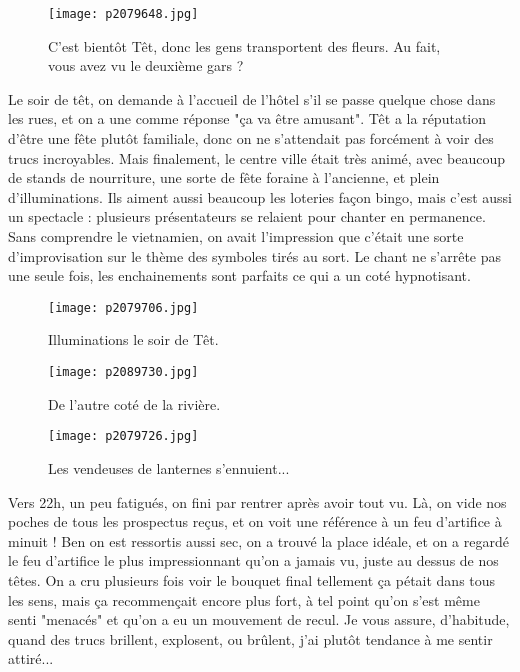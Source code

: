\documentclass{book}
\begin{document}
\begin{figure}[h]
\centering
\texttt{[image: p2079648.jpg]}
\caption*{C'est bientôt Têt, donc les gens transportent des fleurs. Au fait, vous avez vu le deuxième gars ?}
\end{figure}

Le soir de têt, on demande à l'accueil de l'hôtel s'il se passe quelque chose dans les rues, et on a une comme réponse "ça va être amusant". Têt a la réputation d'être une fête plutôt familiale, donc on ne s'attendait pas forcément à voir des trucs incroyables. Mais finalement, le centre ville était très animé, avec beaucoup de stands de nourriture, une sorte de fête foraine à l'ancienne, et plein d'illuminations. Ils aiment aussi beaucoup les loteries façon bingo, mais c'est aussi un spectacle : plusieurs présentateurs se relaient pour chanter en permanence. Sans comprendre le vietnamien, on avait l'impression que c'était une sorte d'improvisation sur le thème des symboles tirés au sort. Le chant ne s'arrête pas une seule fois, les enchainements sont parfaits ce qui a un coté hypnotisant.




\begin{figure}[h]
\centering
\texttt{[image: p2079706.jpg]}
\caption*{Illuminations le soir de Têt.}
\end{figure}




\begin{figure}[h]
\centering
\texttt{[image: p2089730.jpg]}
\caption*{De l'autre coté de la rivière.}
\end{figure}


\begin{figure}[h]
\centering
\texttt{[image: p2079726.jpg]}
\caption*{Les vendeuses de lanternes s'ennuient...}
\end{figure}

Vers 22h, un peu fatigués, on fini par rentrer après avoir tout vu. Là, on vide nos poches de tous les prospectus reçus, et on voit une référence à un feu d'artifice à minuit ! Ben on est ressortis aussi sec, on a trouvé la place idéale, et on a regardé le feu d'artifice le plus impressionnant qu'on a jamais vu, juste au dessus de nos têtes. On a cru plusieurs fois voir le bouquet final tellement ça pétait dans tous les sens, mais ça recommençait encore plus fort, à tel point qu'on s'est même senti "menacés" et qu'on a eu un mouvement de recul. Je vous assure, d'habitude, quand des trucs brillent, explosent, ou brûlent, j'ai plutôt tendance à me sentir attiré...
\end{document}

